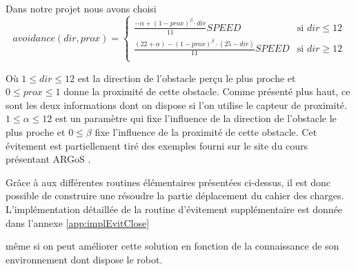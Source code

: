 Dans notre projet nous avons choisi
\[avoidance(dir, prox)=
  \begin{cases}
      \frac{-\alpha +(1-prox)^{\beta}\cdot dir}{11}SPEED & \text{si }dir \leq 12\\
      \frac{(22+\alpha )-(1-prox)^{\beta}\cdot (25-dir)}{11}SPEED & \text{si }dir \geq 12\\
  \end{cases}
\]

Où $ 1 \leq dir \leq 12 $ est la direction de l'obstacle perçu le plus proche et \hbox{$0 \leq prox \leq 1$} donne la proximité de cette obstacle. Comme présenté plus haut, ce sont les deux informations dont on dispose si l'on utilise le capteur de proximité.  \(1 \leq \alpha \leq 12 \) est un paramètre qui fixe l'influence de la direction de l'obstacle le plus proche et \(0 \leq \beta \) fixe l'influence de la proximité de cette obstacle. Cet évitement est partiellement tiré des exemples fourni sur le site du cours présentant ARGoS \cite{argosSite1}.

Grâce à aux différentes routines élémentaires présentées ci-dessus, il est donc possible de construire une résoudre la partie déplacement du cahier des charges. L'implémentation détaillée de la routine d'évitement supplémentaire est donnée dans l'annexe \ref{app:implEvitClose}



même si on peut améliorer cette solution en fonction de la connaissance de son environnement dont dispose le robot.

